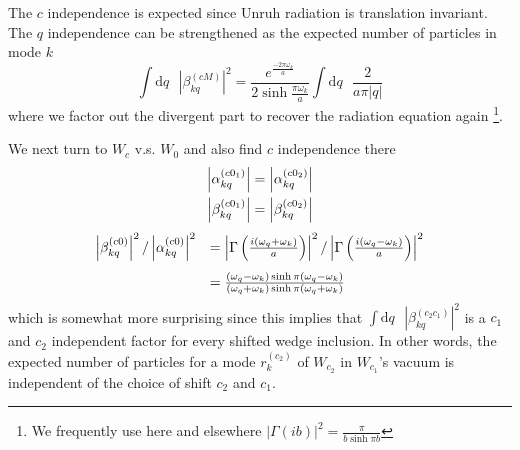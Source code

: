 \documentclass[12pt,a4paper]{article}
\newcommand{\dv}[1]{\mathrm{d} #1 \text{ }}
\begin{document}
The $c$ independence is expected since Unruh radiation is translation invariant. The $q$ independence can be strengthened as the expected number of particles in mode $k$
\begin{equation}
 \int \dv{q} \left|\beta_{kq}^{(cM)}\right|^2 = \frac{e^{\frac{-2 \pi \omega_k}{a}}}{2 \sinh \frac{\pi \omega_k}{a}} \int \dv{q} \frac{2}{a\pi |q|}
\end{equation}
where we factor out the divergent part to recover the radiation equation again \footnote{We frequently use here and elsewhere $|\Gamma(ib)|^2 = \frac{\pi}{b \sinh \pi b}$}.

We next turn to $W_c$ v.s. $W_0$ and also find $c$ independence there 
\begin{equation}
  \begin{array}{c}
    \left|\alpha_{kq}^{(c0_1)}\right| = \left|\alpha_{kq}^{(c0_2)}\right| \vspace{4pt}\\
    \left|\beta_{kq}^{(c0_1)}\right| = \left|\beta_{kq}^{(c0_2)}\right| \\
  \end{array}
\end{equation}
\begin{equation}
  \begin{array}{ll}
      \left|\beta_{kq}^{(c0)}\right|^2 / \left|\alpha_{kq}^{(c0)}\right|^2 \vspace{4pt} &= \left|\Gamma\left(\frac{i(\omega_q + \omega_k)}{a}\right)\right|^2 / \left|\Gamma\left(\frac{i(\omega_q - \omega_k)}{a}\right)\right|^2 \vspace{4pt} \\
  & = \frac{(\omega_q - \omega_k) \sinh \pi (\omega_q - \omega_k)}{(\omega_q + \omega_k) \sinh \pi (\omega_q + \omega_k)} \\
  \end{array}
  \label{nonzero_ratio}
\end{equation}
which is somewhat more surprising since this implies that $\int \dv{q} \left|\beta_{kq}^{(c_2c_1)}\right|^2$ is a $c_1$ and $c_2$ independent factor  for every shifted wedge inclusion.  In other words, the expected number of particles for a mode $r^{(c_2)}_k$ of $W_{c_2}$ in $W_{c_1}$'s vacuum is independent of the choice of shift $c_2$ and $c_1$.
\end{document}

